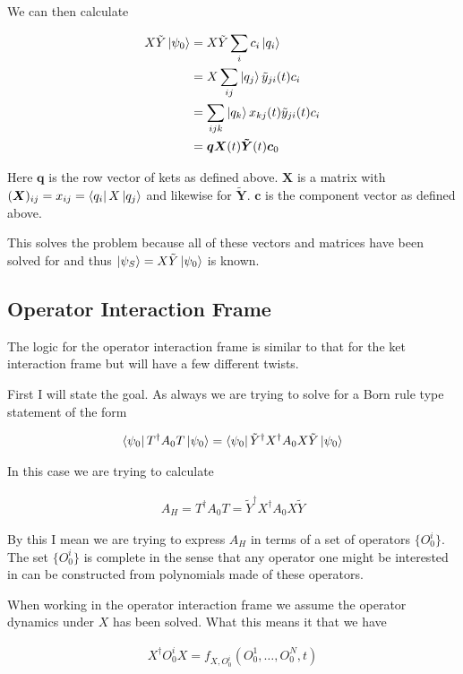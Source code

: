\documentclass[12pt]{article}
\newcommand{\bv}[1]{\boldsymbol{#1}}
\begin{document}
We can then calculate

\begin{align}
X\tilde{Y}\ket{\psi_0} &= X\tilde{Y}\sum_i c_i \ket{q_i}\\
&= X\sum_{ij}\ket{q_j} \tilde{y}_{ji}(t) c_i\\
&= \sum_{ijk} \ket{q_k} x_{kj}(t)\tilde{y}_{ji}(t)c_i \\
&= \bv{q}\bv{X}(t)\bv{\tilde{Y}}(t)\bv{c}_0
\end{align}

Here $\bv{q}$ is the row vector of kets as defined above. $\bv{X}$ is a matrix with $(\bv{X})_{ij} = x_{ij} = \bra{q_i}X\ket{q_j}$ and likewise for $\bv{\tilde{Y}}$. $\bv{c}$ is the component vector as defined above.

This solves the problem because all of these vectors and matrices have been solved for and thus $\ket{\psi_S} = X\tilde{Y}\ket{\psi_0}$ is known.


\subsection{Operator Interaction Frame}

The logic for the operator interaction frame is similar to that for the ket interaction frame but will have a few different twists.

First I will state the goal. As always we are trying to solve for a Born rule type statement of the form

\begin{align}
\bra{\psi_0} T^{\dag} A_0 T \ket{\psi_0} = \bra{\psi_0} \tilde{Y}^{\dag} X^{\dag} A_0 X \tilde{Y} \ket{\psi_0}
\end{align}

In this case we are trying to calculate

\begin{align}
A_H = T^{\dag} A_0 T = \tilde{Y}^{\dag} X^{\dag} A_0 X \tilde{Y}
\end{align}

By this I mean we are trying to express $A_H$ in terms of a set of operators $\{O_0^i\}$. The set $\{O_0^i\}$ is complete in the sense that any operator one might be interested in can be constructed from polynomials made of these operators. 

When working in the operator interaction frame we assume the operator dynamics under $X$ has been solved. What this means it that we have

\begin{align}
X^{\dag}O_0^iX = f_{X,O_0^i}\left(O_0^1,\ldots,O_0^N,t\right)
\end{align}
\end{document}
